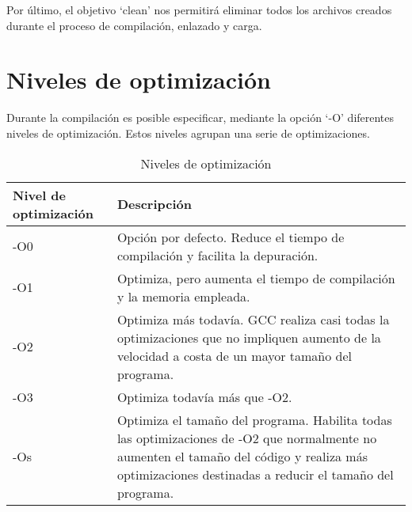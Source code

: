 
Por último, el objetivo `clean' nos permitirá eliminar todos los archivos creados durante el proceso de compilación, enlazado y carga.

\section{Niveles de optimización}
Durante la compilación es posible especificar, mediante la opción `-O' diferentes niveles de optimización. Estos niveles agrupan una serie de optimizaciones.

\begin{table}[H]
\begin{center}
\begin{tabularx}{\textwidth}{|l|X|}
    \hline
    Nivel de optimización & Descripción\\
    \hline
    \hline
   	-O0 & Opción por defecto. Reduce el tiempo de compilación y facilita la depuración.\\
    \hline
    -O1 & Optimiza, pero aumenta el tiempo de compilación y la memoria empleada.\\
    \hline
    -O2 & Optimiza más todavía. GCC realiza casi todas la optimizaciones que no impliquen aumento de la velocidad a costa de un mayor tamaño del programa.\\
    \hline
    -O3 & Optimiza todavía más que -O2.\\
    \hline
    -Os & Optimiza el tamaño del programa. Habilita todas las optimizaciones de -O2 que normalmente no aumenten el tamaño del código y realiza más optimizaciones destinadas a reducir el tamaño del programa.\\
    \hline
  \end{tabularx}
\end{center}
\caption{Niveles de optimización}
\label{tab:optimizacionx}
\end{table}

